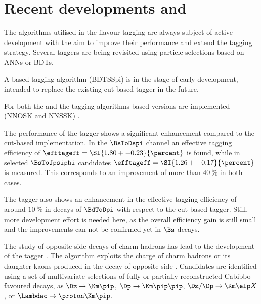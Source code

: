 \section{Recent developments and \RunTwo}
\label{sec:flavour_tagging:developments}

The algorithms utilised in the flavour tagging are always subject of active
development with the aim to improve their performance and extend the tagging
strategy. Several taggers are being revisited using particle selections based on
\acp{ANN} or \acp{BDT}.

A \BDT based \SSpi tagging algorithm (\acs{BDTSSpi}) is in the stage of early
development, intended to replace the existing cut-based \SSpi tagger in the
future.

For both the \OSK and the \SSK tagging algorithms \ANN based versions are
implemented (\acs{NNOSK} and \acs{NNSSK}) \cite{FT:KaonNNet}. 

The performance of the \NNSSK tagger shows a significant enhancement compared to
the cut-based \SSK implementation. In the $\BsToDspi$ channel an effective
tagging efficiency of $\efftageff = \SI{1.80 +- 0.23}{\percent}$ is found, while
in selected $\BsToJpsiphi$ candidates $\efftageff = \SI{1.26 +- 0.17}{\percent}$
is measured. This corresponds to an improvement of more than $\SI{40}{\percent}$
in both cases.

The \NNOSK tagger also shows an enhancement in the effective tagging efficiency
of around $\SI{10}{\percent}$ in decays of $\BdToDpi$ with respect to the
cut-based \OSK tagger. Still, more development effort is needed here, as the
overall efficiency gain is still small and the improvements can not be confirmed
yet in $\Bs$ decays.

The study of opposite side decays of charm hadrons has lead to the development
of the \OSc tagger \cite{FT:OSCharm}. The \OSc algorithm exploits the charge of
charm hadrons or its daughter kaons produced in the decay of opposite side
\bhadrons. Candidates are identified using a set of multivariate selections of
fully or partially reconstructed Cabibbo-favoured decays, as \eg
$\Dz\to\Km\pip$, $\Dp\to\Km\pip\pip$, $\Dz/\Dp\to\Km\elp X$, or
$\Lambdac\to\proton\Km\pip$. 

